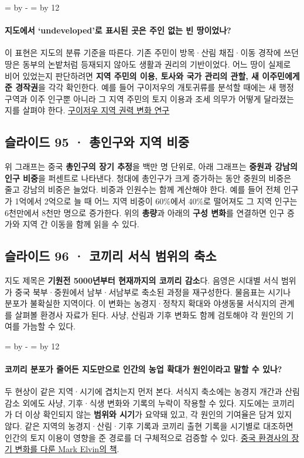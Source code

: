 \documentclass[10pt,a4paper]{article}
\newcommand{\ReserveQuestionSpace}{%
  \par\begingroup
  \dimen0=\pagegoal \advance\dimen0 by -\pagetotal
  \dimen2=\baselineskip \multiply\dimen2 by 12
  \ifdim\dimen0<\dimen2 \newpage\fi
  \endgroup}
\begin{document}
\ReserveQuestionSpace
\paragraph{지도에서 ‘undeveloped’로 표시된 곳은 주인 없는 빈 땅이었나?}
이 표현은 지도의 분류 기준을 따른다. 기존 주민이 방목·산림 채집·이동 경작에 쓰던 땅은 동부의 논밭처럼 등재되지 않아도 생활과 권리의 기반이었다. 어느 땅이 실제로 비어 있었는지 판단하려면 \textbf{지역 주민의 이용, 토사와 국가 관리의 관할, 새 이주민에게 준 경작권}을 각각 확인한다. 예를 들어 구이저우의 개토귀류를 분석할 때에는 새 행정구역과 이주 인구뿐 아니라 그 지역 주민의 토지 이용과 조세 의무가 어떻게 달라졌는지를 살펴야 한다. \href{https://www1.ihp.sinica.edu.tw/en/Publications/Bulletin/1118/Article/268}{구이저우 지역 권력 변화 연구}\par

\subsection{슬라이드 95 · 총인구와 지역 비중}
위 그래프는 중국 \textbf{총인구의 장기 추정}을 백만 명 단위로, 아래 그래프는 \textbf{중원과 강남의 인구 비중}을 퍼센트로 나타낸다. 청대에 총인구가 크게 증가하는 동안 중원의 비중은 줄고 강남의 비중은 늘었다. 비중과 인원수는 함께 계산해야 한다. 예를 들어 전체 인구가 1억에서 2억으로 늘 때 어느 지역 비중이 60\%에서 40\%로 떨어져도 그 지역 인구는 6천만에서 8천만 명으로 증가한다. 위의 \textbf{총량}과 아래의 \textbf{구성 변화}를 연결하면 인구 증가와 지역 간 이동을 함께 읽을 수 있다.\par

\subsection{슬라이드 96 · 코끼리 서식 범위의 축소}
지도 제목은 \textbf{기원전 5000년부터 현재까지의 코끼리 감소}다. 음영은 시대별 서식 범위가 중국 북부·중원에서 남부·서남부로 축소된 과정을 재구성한다. 물음표는 시기나 분포가 불확실한 지역이다. 이 변화는 농경지·정착지 확대와 야생동물 서식지의 관계를 살펴볼 환경사 자료가 된다. 사냥, 산림과 기후 변화도 함께 검토해야 각 원인의 기여를 가늠할 수 있다.\par

\ReserveQuestionSpace
\paragraph{코끼리 분포가 줄어든 지도만으로 인간의 농업 확대가 원인이라고 말할 수 있나?}
두 현상이 같은 지역·시기에 겹치는지 먼저 본다. 서식지 축소에는 농경지 개간과 산림 감소 외에도 사냥, 기후·식생 변화와 기록의 누락이 작용할 수 있다. 지도에는 코끼리가 더 이상 확인되지 않는 \textbf{범위와 시기}가 요약돼 있고, 각 원인의 기여율은 담겨 있지 않다. 같은 지역의 농경지·산림·기후 기록과 코끼리 출현 기록을 시기별로 대조하면 인간의 토지 이용이 영향을 준 경로를 더 구체적으로 검증할 수 있다. \href{https://yalebooks.yale.edu/book/9780300119930/the-retreat-of-the-elephants/}{중국 환경사의 장기 변화를 다룬 Mark Elvin의 책}.\par
\end{document}
